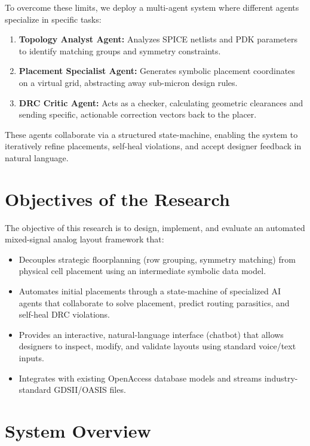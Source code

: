 To overcome these limits, we deploy a multi-agent system where different agents specialize in specific tasks:
\begin{enumerate}
    \item \textbf{Topology Analyst Agent:} Analyzes SPICE netlists and PDK parameters to identify matching groups and symmetry constraints.
    \item \textbf{Placement Specialist Agent:} Generates symbolic placement coordinates on a virtual grid, abstracting away sub-micron design rules.
    \item \textbf{DRC Critic Agent:} Acts as a checker, calculating geometric clearances and sending specific, actionable correction vectors back to the placer.
\end{enumerate}

These agents collaborate via a structured state-machine, enabling the system to iteratively refine placements, self-heal violations, and accept designer feedback in natural language.

\section{Objectives of the Research}
\label{sec:objectives}

The objective of this research is to design, implement, and evaluate an automated mixed-signal analog layout framework that:
\begin{itemize}
    \item Decouples strategic floorplanning (row grouping, symmetry matching) from physical cell placement using an intermediate symbolic data model.
    \item Automates initial placements through a state-machine of specialized AI agents that collaborate to solve placement, predict routing parasitics, and self-heal DRC violations.
    \item Provides an interactive, natural-language interface (chatbot) that allows designers to inspect, modify, and validate layouts using standard voice/text inputs.
    \item Integrates with existing OpenAccess database models and streams industry-standard GDSII/OASIS files.
\end{itemize}

\section{System Overview}
\label{sec:system_overview}

